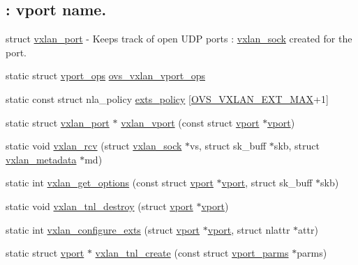 \subsection*{\+: vport name.}
\label{_amgrp11b33af0c85e2c8a3c03b696f666e431}%
struct \hyperlink{structvxlan__port}{vxlan\+\_\+port} -\/ Keeps track of open U\+D\+P ports \+: \hyperlink{structvxlan__sock}{vxlan\+\_\+sock} created for the port. \begin{DoxyCompactItemize}
\item 
static struct \hyperlink{structvport__ops}{vport\+\_\+ops} \hyperlink{vport-vxlan_8c_a14100e1b742c7bb52f41541582330814}{ovs\+\_\+vxlan\+\_\+vport\+\_\+ops}
\item 
static const struct nla\+\_\+policy \hyperlink{vport-vxlan_8c_a8bca1dc2eb9e18c687ef067cae154b8b}{exts\+\_\+policy} \mbox{[}\hyperlink{openvswitch_8h_ac764e78fe2e06d11f39448e337292c7c}{O\+V\+S\+\_\+\+V\+X\+L\+A\+N\+\_\+\+E\+X\+T\+\_\+\+M\+A\+X}+1\mbox{]}
\item 
static struct \hyperlink{structvxlan__port}{vxlan\+\_\+port} $\ast$ \hyperlink{vport-vxlan_8c_ab19470f9c73474113f37dc3c65265294}{vxlan\+\_\+vport} (const struct \hyperlink{structvport}{vport} $\ast$\hyperlink{structvport}{vport})
\item 
static void \hyperlink{vport-vxlan_8c_a0b39f553c071625dac0570f97ef7924a}{vxlan\+\_\+rcv} (struct \hyperlink{structvxlan__sock}{vxlan\+\_\+sock} $\ast$vs, struct sk\+\_\+buff $\ast$skb, struct \hyperlink{structvxlan__metadata}{vxlan\+\_\+metadata} $\ast$md)
\item 
static int \hyperlink{vport-vxlan_8c_a50ef73121a1de8be6425c76ea97fc3da}{vxlan\+\_\+get\+\_\+options} (const struct \hyperlink{structvport}{vport} $\ast$\hyperlink{structvport}{vport}, struct sk\+\_\+buff $\ast$skb)
\item 
static void \hyperlink{vport-vxlan_8c_aade4bb74066fe5f4ab11820ab7c90485}{vxlan\+\_\+tnl\+\_\+destroy} (struct \hyperlink{structvport}{vport} $\ast$\hyperlink{structvport}{vport})
\item 
static int \hyperlink{vport-vxlan_8c_a1c323f01bc67db23967f87810a23939b}{vxlan\+\_\+configure\+\_\+exts} (struct \hyperlink{structvport}{vport} $\ast$\hyperlink{structvport}{vport}, struct nlattr $\ast$attr)
\item 
static struct \hyperlink{structvport}{vport} $\ast$ \hyperlink{vport-vxlan_8c_a15944f1b89ca72bfaf953d278bf09ca7}{vxlan\+\_\+tnl\+\_\+create} (const struct \hyperlink{structvport__parms}{vport\+\_\+parms} $\ast$parms)
\item 

\end{DoxyCompactItemize}
